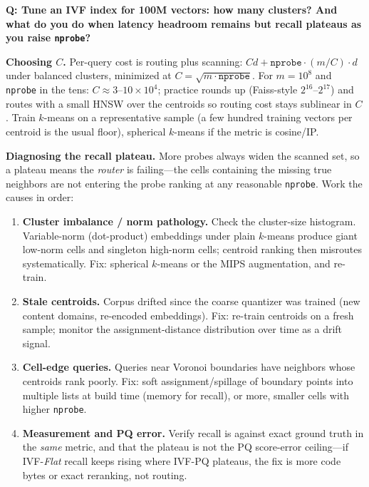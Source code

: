 \begin{interviewq}
\textbf{Q: Tune an IVF index for 100M vectors: how many clusters? And what do you do when latency headroom remains but recall plateaus as you raise \texttt{nprobe}?}

 \quad {} \quad \badgefreq{\freqmed}

\stronganswer

\textbf{Choosing $C$.} Per-query cost is routing plus scanning: $C d + \texttt{nprobe} \cdot (m/C) \cdot d$ under balanced clusters, minimized at $C = \sqrt{m \cdot \texttt{nprobe}}$. For $m = 10^8$ and \texttt{nprobe} in the tens: $C \approx 3$--$10 \times 10^4$; practice rounds up (Faiss-style $2^{16}$--$2^{17}$) and routes with a small HNSW over the centroids so routing cost stays sublinear in $C$. Train $k$-means on a representative sample (a few hundred training vectors per centroid is the usual floor), spherical $k$-means if the metric is cosine/IP.

\textbf{Diagnosing the recall plateau.} More probes always widen the scanned set, so a plateau means the \emph{router} is failing---the cells containing the missing true neighbors are not entering the probe ranking at any reasonable \texttt{nprobe}. Work the causes in order:
\begin{enumerate}
    \item \textbf{Cluster imbalance / norm pathology.} Check the cluster-size histogram. Variable-norm (dot-product) embeddings under plain $k$-means produce giant low-norm cells and singleton high-norm cells; centroid ranking then misroutes systematically. Fix: spherical $k$-means or the MIPS augmentation, and re-train.
    \item \textbf{Stale centroids.} Corpus drifted since the coarse quantizer was trained (new content domains, re-encoded embeddings). Fix: re-train centroids on a fresh sample; monitor the assignment-distance distribution over time as a drift signal.
    \item \textbf{Cell-edge queries.} Queries near Voronoi boundaries have neighbors whose centroids rank poorly. Fix: soft assignment/spillage of boundary points into multiple lists at build time (memory for recall), or more, smaller cells with higher \texttt{nprobe}.
    \item \textbf{Measurement and PQ error.} Verify recall is against exact ground truth in the \emph{same} metric, and that the plateau is not the PQ score-error ceiling---if IVF-\emph{Flat} recall keeps rising where IVF-PQ plateaus, the fix is more code bytes or exact reranking, not routing.
\end{enumerate}


\end{interviewq}
